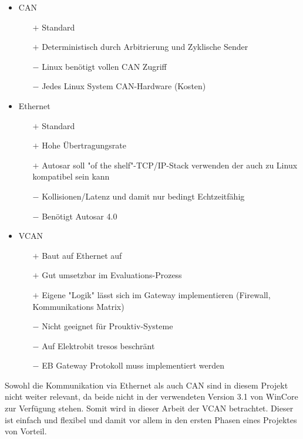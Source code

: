 \documentclass[
  a4paper,					    %
  twoside,
  DIV=calc,     				%
  bibliography=totoc,
  cleardoublepage=empty,
  ngerman,     					%
  final       					%
]{scrbook}
\begin{document}
\begin{itemize}
    \item CAN
    \begin{itemize}
        \item[$+$] Standard
        \item[$+$] Deterministisch durch Arbitrierung und Zyklische Sender
        \item[$-$] Linux benötigt vollen CAN Zugriff
        \item[$-$] Jedes Linux System CAN-Hardware (Kosten)
    \end{itemize}
    \item Ethernet
    \begin{itemize}
        \item[$+$] Standard
        \item[$+$] Hohe Übertragungsrate
        \item[$+$] Autosar soll "of the shelf"-TCP/IP-Stack verwenden der auch zu Linux kompatibel sein kann\cite[S. 21]{autosar_eth}
        \item[$-$] Kollisionen/Latenz und damit nur bedingt Echtzeitfähig
        \item[$-$] Benötigt Autosar 4.0
    \end{itemize}
    \item VCAN
    \begin{itemize}
        \item[$+$] Baut auf Ethernet auf
        \item[$+$] Gut umsetzbar im Evaluations-Prozess
        \item[$+$] Eigene "Logik" lässt sich im Gateway implementieren (Firewall, Kommunikations Matrix)
        \item[$-$] Nicht geeignet für Prouktiv-Systeme
        \item[$-$] Auf Elektrobit tresos beschränt
        \item[$-$] EB Gateway Protokoll muss implementiert werden
    \end{itemize}
\end{itemize}

Sowohl die Kommunikation via Ethernet als auch CAN sind in diesem Projekt nicht weiter relevant, da beide nicht in der verwendeten Version 3.1 von WinCore zur Verfügung stehen. Somit wird in dieser Arbeit der VCAN betrachtet. Dieser ist einfach und flexibel und damit vor allem in den ersten Phasen eines Projektes von Vorteil.
\end{document}
